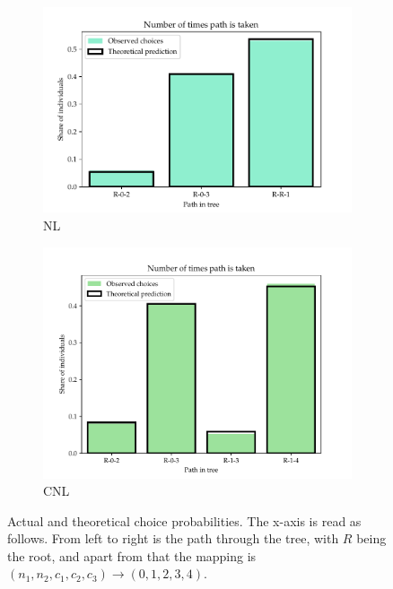 \begin{figure}[h]
  \begin{center}
  \begin{subfigure}{0.45\linewidth}
    \caption{NL}
    \centering\includegraphics[width=\linewidth]{03_figures/choice_fractions_NL.pdf}
  \end{subfigure}
  \begin{subfigure}{0.45\linewidth}
    \caption{CNL}
    \centering\includegraphics[width=\linewidth]{03_figures/choice_fractions.pdf}
  \end{subfigure}
  \caption[Actual and theoretical choice probabilities.]{Actual and theoretical choice probabilities. The x-axis is read as follows. From left to right is the path through the tree, with $R$ being the root, and apart from that the mapping is $(n_1, n_2, c_1,c_2,c_3) \rightarrow (0,1,2,3,4)$.}
  \label{fig: choiceprobs}
\end{center}
\end{figure}

